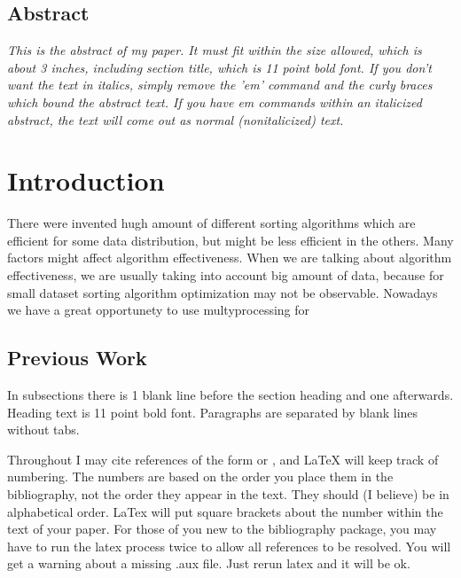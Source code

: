 \maketitle


\subsection*{\centering Abstract}
{\em
This is the abstract of my paper.  It must fit within the size allowed, which
is about 3 inches, including section title, which is 11 point bold font.  If 
you don't want the text in italics, simply remove the 'em' command and the 
curly braces which bound the abstract text.  If you have em commands within an 
italicized abstract, the text will come out as normal (nonitalicized) text.  
}

\section{Introduction}

There were invented hugh amount of different sorting algorithms which are efficient for some data distribution, but might be less efficient in the others. Many factors might affect algorithm effectiveness.
When we are talking about algorithm effectiveness, we are usually taking into account big amount of data, because for small dataset sorting algorithm optimization may not be observable.
Nowadays we have a great opportunety to use multyprocessing for 

\subsection{Previous Work}
In subsections there is 1 blank line before the section heading and one 
afterwards.  Heading text is 11 point bold font.  Paragraphs are separated by 
blank lines without tabs.

Throughout I may cite references of the form \cite{key:foo} or
\cite{foo:baz}, and LaTeX will keep track of numbering.  The numbers are based
on the order you place them in the bibliography, not the order they appear in
the text.  They should (I believe) be in alphabetical order.  LaTex will put
square brackets about the number within the text of your paper.  For those of 
you new to the bibliography package, you may have to run the latex process 
twice to allow all references to be resolved.  You will get a warning about
a missing .aux file.  Just rerun latex and it will be ok.

